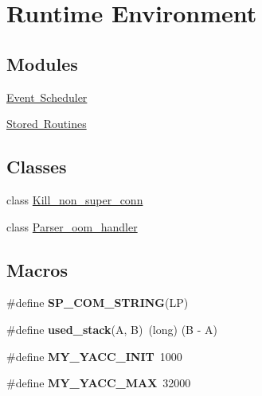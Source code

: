 \hypertarget{group__Runtime__Environment}{}\section{Runtime Environment}
\label{group__Runtime__Environment}
\subsection*{Modules}
\begin{DoxyCompactItemize}
\item 
\mbox{\hyperlink{group__Event__Scheduler}{Event Scheduler}}
\item 
\mbox{\hyperlink{group__Stored__Routines}{Stored Routines}}
\end{DoxyCompactItemize}
\subsection*{Classes}
\begin{DoxyCompactItemize}
\item 
class \mbox{\hyperlink{classKill__non__super__conn}{Kill\+\_\+non\+\_\+super\+\_\+conn}}
\item 
class \mbox{\hyperlink{classParser__oom__handler}{Parser\+\_\+oom\+\_\+handler}}
\end{DoxyCompactItemize}
\subsection*{Macros}
\begin{DoxyCompactItemize}
\item 
\#define {\bfseries S\+P\+\_\+\+C\+O\+M\+\_\+\+S\+T\+R\+I\+NG}(LP)
\item 
\mbox{\label{group__Runtime__Environment_gab5a8b65ae940ccbcd0665dae441270e7}} 
\#define {\bfseries used\+\_\+stack}(A,  B)~(long) (B -\/ A)
\item 
\mbox{\label{group__Runtime__Environment_ga08d1ba6753fe093a35ab0c87ab118b8a}} 
\#define {\bfseries M\+Y\+\_\+\+Y\+A\+C\+C\+\_\+\+I\+N\+IT}~1000
\item 
\mbox{\label{group__Runtime__Environment_ga42ed848262f0f56a57d1e07c0d4878c3}} 
\#define {\bfseries M\+Y\+\_\+\+Y\+A\+C\+C\+\_\+\+M\+AX}~32000
\end{DoxyCompactItemize}
